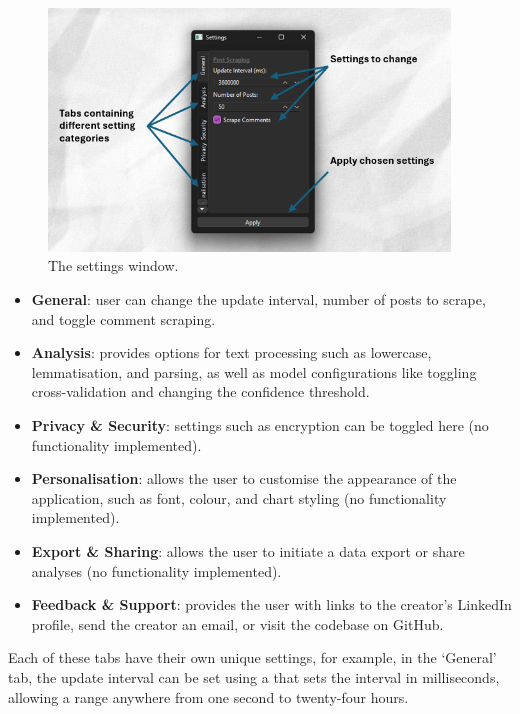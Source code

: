     \begin{figure}[h]
        \centering
            \includegraphics[width=0.95\textwidth]{figures/settings-window-labels.png}
        \caption{The settings window.}
    \end{figure}
    
    \begin{itemize}
        \item \textbf{General}: user can change the update interval, number of posts to scrape, and toggle comment scraping.
        \item \textbf{Analysis}: provides options for text processing such as lowercase, lemmatisation, and  parsing, as well as model configurations like toggling cross-validation and changing the confidence threshold.
        \item \textbf{Privacy \& Security}: settings such as encryption can be toggled here (no functionality implemented).
        \item \textbf{Personalisation}: allows the user to customise the appearance of the application, such as font, colour, and chart styling (no functionality implemented).
        \item \textbf{Export \& Sharing}: allows the user to initiate a data export or share analyses (no functionality implemented).
        \item \textbf{Feedback \& Support}: provides the user with links to the creator's LinkedIn profile, send the creator an email, or visit the codebase on GitHub.
    \end{itemize}

    Each of these tabs have their own unique settings, for example, in the `General' tab, the update interval can be set using a  that sets the interval in milliseconds, allowing a range anywhere from one second to twenty-four hours.

